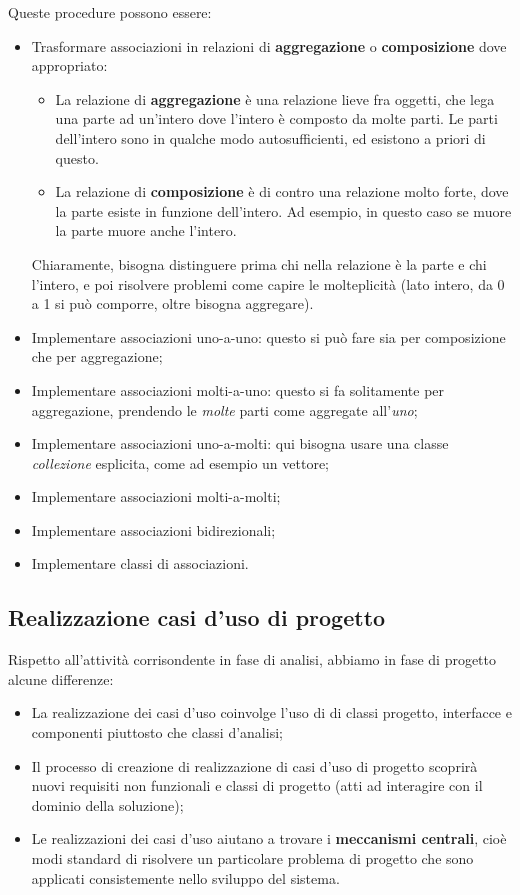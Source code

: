 \documentclass[a4paper,11pt]{article}
\begin{document}
Queste procedure possono essere:
\begin{itemize}
	\item Trasformare associazioni in relazioni di \textbf{aggregazione} o \textbf{composizione} dove appropriato:

		\begin{itemize}
			\item La relazione di \textbf{aggregazione} è una relazione lieve fra oggetti, che lega una parte ad un'intero dove l'intero è composto da molte parti.
Le parti dell'intero sono in qualche modo autosufficienti, ed esistono a priori di questo.
			\item La relazione di \textbf{composizione} è di contro una relazione molto forte, dove la parte esiste in funzione dell'intero. Ad esempio, in questo caso se muore la parte muore anche l'intero.
		\end{itemize}

		Chiaramente, bisogna distinguere prima chi nella relazione è la parte e chi l'intero, e poi risolvere problemi come capire le molteplicità (lato intero, da 0 a 1 si può comporre, oltre bisogna aggregare).

	\item Implementare associazioni uno-a-uno: questo si può fare sia per composizione che per aggregazione;
	\item Implementare associazioni molti-a-uno: questo si fa solitamente per aggregazione, prendendo le \textit{molte} parti come aggregate all'\textit{uno};
	\item Implementare associazioni uno-a-molti: qui bisogna usare una classe \textit{collezione} esplicita, come ad esempio un vettore; 
	\item Implementare associazioni molti-a-molti;
	\item Implementare associazioni bidirezionali;
	\item Implementare classi di associazioni.
\end{itemize}

\subsection{Realizzazione casi d'uso di progetto}
Rispetto all'attività corrisondente in fase di analisi, abbiamo in fase di progetto alcune differenze:
\begin{itemize}
	\item La realizzazione dei casi d'uso coinvolge l'uso di di classi progetto, interfacce e componenti piuttosto che classi d'analisi;
	\item Il processo di creazione di realizzazione di casi d'uso di progetto scoprirà nuovi requisiti non funzionali e classi di progetto (atti ad interagire con il dominio della soluzione);
	\item Le realizzazioni dei casi d'uso aiutano a trovare i \textbf{meccanismi centrali}, cioè modi standard di risolvere un particolare problema di progetto che sono applicati consistemente nello sviluppo del sistema. 
\end{itemize}
\end{document}
